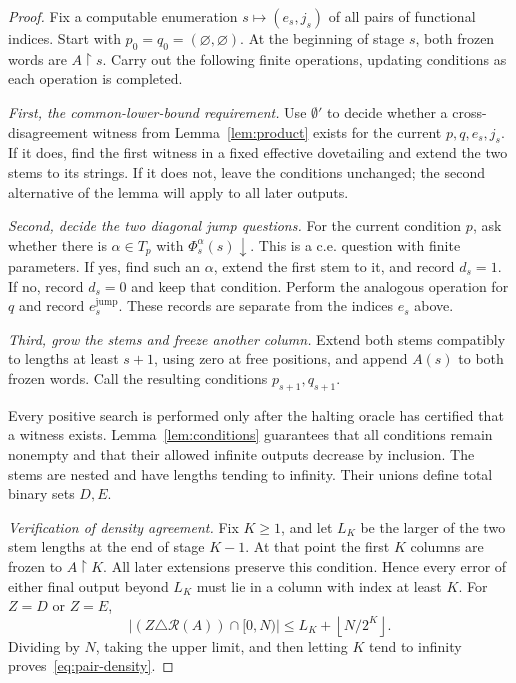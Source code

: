 \documentclass[11pt,a4paper]{article}
\newcommand{\R}{\mathcal R}
\newcommand{\pref}{\mathbin{\upharpoonright}}
\theoremstyle{definition}\newtheorem{definition}[theorem]{Definition}
\theoremstyle{remark}\newtheorem{remark}[theorem]{Remark}
\begin{document}
\begin{proof}
Fix a computable enumeration $s\mapsto(e_s,j_s)$ of all pairs of functional indices. Start with $p_0=q_0=(\varnothing,\varnothing)$. At the beginning of stage $s$, both frozen words are $A\pref s$. Carry out the following finite operations, updating conditions as each operation is completed.

\emph{First, the common-lower-bound requirement.} Use $\emptyset'$ to decide whether a cross-disagreement witness from Lemma~\ref{lem:product} exists for the current $p,q,e_s,j_s$. If it does, find the first witness in a fixed effective dovetailing and extend the two stems to its strings. If it does not, leave the conditions unchanged; the second alternative of the lemma will apply to all later outputs.

\emph{Second, decide the two diagonal jump questions.} For the current condition $p$, ask whether there is $\alpha\in T_p$ with $\Phi_s^\alpha(s)\downarrow$. This is a c.e. question with finite parameters. If yes, find such an $\alpha$, extend the first stem to it, and record $d_s=1$. If no, record $d_s=0$ and keep that condition. Perform the analogous operation for $q$ and record $e_s^{\mathrm{jump}}$. These records are separate from the indices $e_s$ above.

\emph{Third, grow the stems and freeze another column.} Extend both stems compatibly to lengths at least $s+1$, using zero at free positions, and append $A(s)$ to both frozen words. Call the resulting conditions $p_{s+1},q_{s+1}$.

Every positive search is performed only after the halting oracle has certified that a witness exists. Lemma~\ref{lem:conditions} guarantees that all conditions remain nonempty and that their allowed infinite outputs decrease by inclusion. The stems are nested and have lengths tending to infinity. Their unions define total binary sets $D,E$.

\emph{Verification of density agreement.} Fix $K\geq1$, and let $L_K$ be the larger of the two stem lengths at the end of stage $K-1$. At that point the first $K$ columns are frozen to $A\pref K$. All later extensions preserve this condition. Hence every error of either final output beyond $L_K$ must lie in a column with index at least $K$. For $Z=D$ or $Z=E$,
\begin{equation}
 |(Z\triangle\R(A))\cap[0,N)|
 \leq L_K+\left\lfloor N/2^K\right\rfloor.
 \label{eq:forcing-density}
\end{equation}
Dividing by $N$, taking the upper limit, and then letting $K$ tend to infinity proves~\eqref{eq:pair-density}.


\end{proof}
\end{document}

